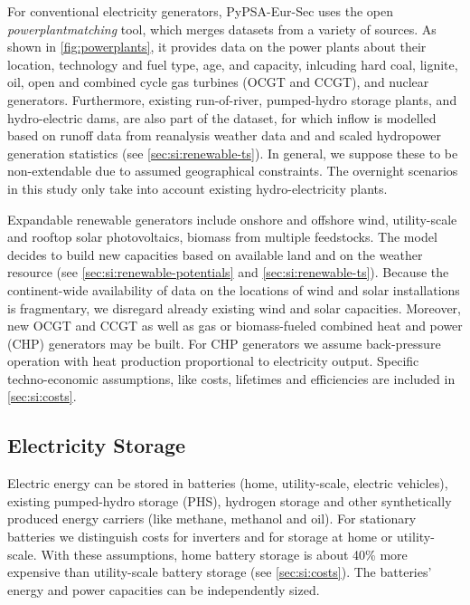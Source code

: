 For conventional electricity generators, PyPSA-Eur-Sec uses the open
\textit{powerplantmatching} tool, which merges datasets from a variety of
sources. As shown in \cref{fig:powerplants}, it
provides data on the power plants about their location, technology and fuel
type, age, and capacity, inlcuding hard coal, lignite, oil, open and combined
cycle gas turbines (OCGT and CCGT), and nuclear generators. Furthermore,
existing run-of-river, pumped-hydro storage plants, and hydro-electric dams, are
also part of the dataset, for which inflow is modelled based on runoff data from
reanalysis weather data and and scaled hydropower generation statistics (see
\cref{sec:si:renewable-ts}). In general, we suppose these to be non-extendable
due to assumed geographical constraints. The overnight scenarios in this study
only take into account existing hydro-electricity plants.

Expandable renewable generators include onshore and offshore wind, utility-scale
and rooftop solar photovoltaics, biomass from multiple feedstocks. The model
decides to build new capacities based on available land and on the weather
resource (see \cref{sec:si:renewable-potentials} and
\cref{sec:si:renewable-ts}). Because the continent-wide availability of data on
the locations of wind and solar installations is fragmentary, we disregard
already existing wind and solar capacities. Moreover, new OCGT and CCGT as well
as gas or biomass-fueled combined heat and power (CHP) generators may be built.
For CHP generators we assume back-pressure operation with heat production
proportional to electricity output. Specific techno-economic assumptions, like
costs, lifetimes and efficiencies are included in \cref{sec:si:costs}.

\subsection{Electricity Storage}
\label{sec:si:electricity:storage}

Electric energy can be stored in batteries (home, utility-scale, electric
vehicles), existing pumped-hydro storage (PHS), hydrogen storage and other
synthetically produced energy carriers (like methane, methanol and oil). For
stationary batteries we distinguish costs for inverters and for storage at home
or utility-scale. With these assumptions, home battery storage is about 40\%
more expensive than utility-scale battery storage (see \cref{sec:si:costs}). The
batteries' energy and power capacities can be independently sized.

